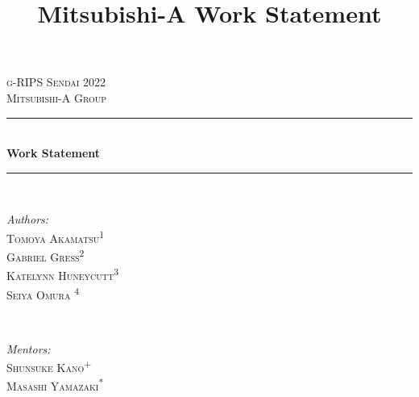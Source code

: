 \documentclass{article}
\title{Mitsubishi-A Work Statement}
\author{}
\date{}
\numberwithin{equation}{section}
\theoremstyle{definition}
\begin{document}
\nocite{*}%


\begin{titlepage}

\newcommand{\HRule}{\rule{\linewidth}{0.5mm}} %

\center %
 

\textsc{\LARGE g-RIPS Sendai 2022}\\[1.5cm] %
\textsc{\Large Mitsubishi-A Group}\\[0.5cm] %


\HRule \\[0.4cm]
{ \huge \bfseries Work Statement}\\[0.4cm] %
\HRule \\[1.5cm]
 

\begin{minipage}{0.4\textwidth}
\begin{flushleft} \large
\emph{Authors:}\\
 \textsc{Tomoya Akamatsu}\textsuperscript{1} \\ %
 \textsc{Gabriel Gress}\textsuperscript{2}\\
 \textsc{Katelynn Huneycutt}\textsuperscript{3}\\
  \textsc{Seiya Omura }\textsuperscript{4}\\
\end{flushleft}
\end{minipage}
~
\begin{minipage}{0.4\textwidth}
\begin{flushright} \large
\emph{Mentors:} \\
 \textsc{Shunsuke Kano}\textsuperscript{+}\\%
 \textsc{Masashi Yamazaki}\textsuperscript{*} 
\end{flushright}
\end{minipage}\\[0.5cm]
\center\begin{minipage}{0.35\textwidth}
\begin{flushleft}\small


\end{flushleft}
\end{minipage}
\end{titlepage}
\end{document}
